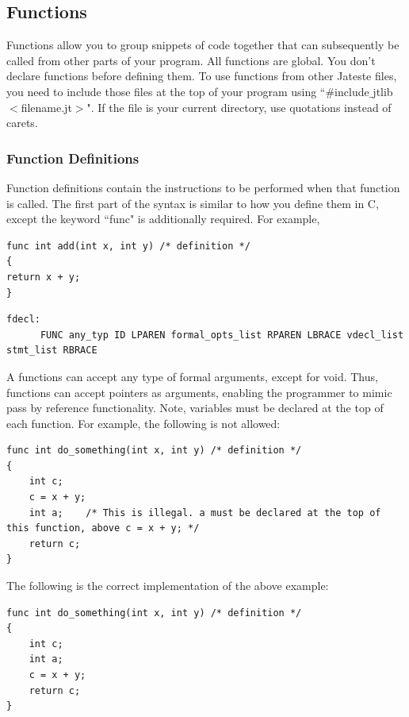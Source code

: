 \documentclass{article}
\begin{document}
\subsection{Functions}
Functions allow you to group snippets of code together that can subsequently be called from other parts of your program. All functions are global. You don't declare functions before defining them. To use functions from other Jateste files, you need to include those files at the top of your program using ``\#include$\_$jtlib $<$filename.jt$>$". If the file is your current directory, use quotations instead of carets.

\subsubsection{Function Definitions}
Function definitions contain the instructions to be performed when that function is called. The first part of the syntax is similar to how you define them in C, except the keyword ``func" is additionally required. For example, 

\begin{lstlisting}
func int add(int x, int y) /* definition */
{
return x + y;
}
\end{lstlisting}

\begin{Verbatim}[frame=single]
fdecl:
	  FUNC any_typ ID LPAREN formal_opts_list RPAREN LBRACE vdecl_list stmt_list RBRACE
\end{Verbatim}

A functions can accept any type of formal arguments, except for void. Thus, functions can accept pointers as arguments, enabling the programmer to mimic pass by reference functionality. Note, variables must be declared at the top of each function. For example, the following is not allowed:

\begin{lstlisting}
func int do_something(int x, int y) /* definition */
{
    int c;
    c = x + y;
    int a;    /* This is illegal. a must be declared at the top of this function, above c = x + y; */
    return c;
}

\end{lstlisting}
The following is the correct implementation of the above example:
\begin{lstlisting}
func int do_something(int x, int y) /* definition */
{
    int c;
    int a;
    c = x + y;
    return c;
}

\end{lstlisting}
\end{document}
